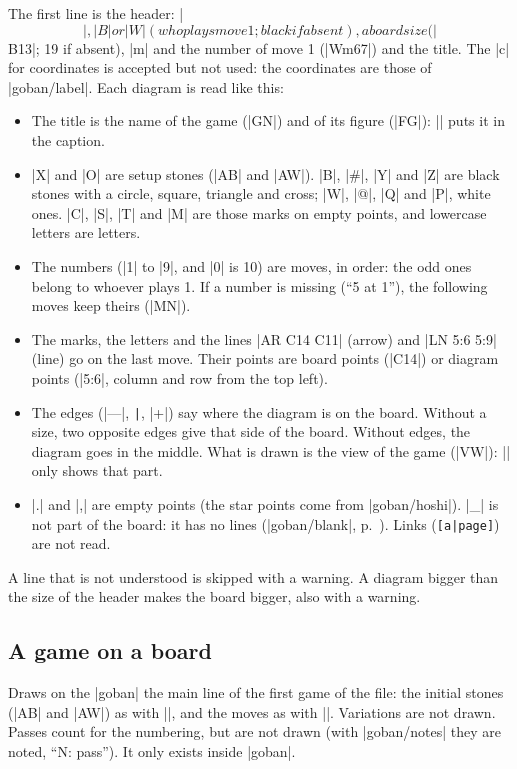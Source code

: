 The first line is the header: |$$|, |B| or |W| (who plays move 1; black if absent), a board size (|$$B13|; 19 if absent), |m| and the number of move 1 (|$$Wm67|) and the title. The |c| for coordinates is accepted but not used: the coordinates are those of |goban/label|. Each diagram is read like this:
\begin{itemize}
	\item The title is the name of the game (|GN|) and of its figure (|FG|): |\sgfdiagrams| puts it in the caption.
	\item |X| and |O| are setup stones (|AB| and |AW|). |B|, |#|, |Y| and |Z| are black stones with a circle, square, triangle and cross; |W|, |@|, |Q| and |P|, white ones. |C|, |S|, |T| and |M| are those marks on empty points, and lowercase letters are letters.
	\item The numbers (|1| to |9|, and |0| is 10) are moves, in order: the odd ones belong to whoever plays 1. If a number is missing (``5 at 1''), the following moves keep theirs (|MN|).
	\item The marks, the letters and the lines |{AR C14 C11}| (arrow) and |{LN 5:6 5:9}| (line) go on the last move. Their points are board points (|C14|) or diagram points (|5:6|, column and row from the top left).
	\item The edges (|---|, \verb+|+, |+|) say where the diagram is on the board. Without a size, two opposite edges give that side of the board. Without edges, the diagram goes in the middle. What is drawn is the view of the game (|VW|): |\sgfdiagrams| only shows that part.
	\item |.| and |,| are empty points (the star points come from |goban/hoshi|). |_| is not part of the board: it has no lines (|goban/blank|, p.~\pageref{subsec:parcial}). Links (\verb+[a|page]+) are not read.
\end{itemize}

A line that is not understood is skipped with a warning. A diagram bigger than the size of the header makes the board bigger, also with a warning.

\subsection{A game on a board}
\label{subsec:sgftablero}

\begin{command}{\sgf{}}

	Draws on the |goban| the main line of the first game of the file: the initial stones (|AB| and |AW|) as with |\stones|, and the moves as with |\moves|. Variations are not drawn. Passes count for the numbering, but are not drawn (with |goban/notes| they are noted, ``N: pass''). It only exists inside |goban|.
\end{command}

